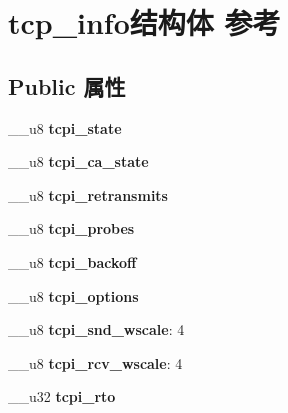 \hypertarget{structtcp__info}{}\section{tcp\+\_\+info结构体 参考}
\label{structtcp__info}
\subsection*{Public 属性}
\begin{DoxyCompactItemize}
\item 
\mbox{\label{structtcp__info_add6732e11a1cc032caf3d4774f13c38d}} 
\+\_\+\+\_\+u8 {\bfseries tcpi\+\_\+state}
\item 
\mbox{\label{structtcp__info_acb7cb67a9228b98f77091a31d52a5165}} 
\+\_\+\+\_\+u8 {\bfseries tcpi\+\_\+ca\+\_\+state}
\item 
\mbox{\label{structtcp__info_a7fa3f436ccee52262213733c53eebbf0}} 
\+\_\+\+\_\+u8 {\bfseries tcpi\+\_\+retransmits}
\item 
\mbox{\label{structtcp__info_a54d1e6bc943fa7ba8730f44478db9828}} 
\+\_\+\+\_\+u8 {\bfseries tcpi\+\_\+probes}
\item 
\mbox{\label{structtcp__info_af61eb2d7dcc0a9b80038d3afa09aee8c}} 
\+\_\+\+\_\+u8 {\bfseries tcpi\+\_\+backoff}
\item 
\mbox{\label{structtcp__info_a27b4013db297053b6e8f79cd851a582a}} 
\+\_\+\+\_\+u8 {\bfseries tcpi\+\_\+options}
\item 
\mbox{\label{structtcp__info_aea7c4bc9649303c541f1223e7b6fab3e}} 
\+\_\+\+\_\+u8 {\bfseries tcpi\+\_\+snd\+\_\+wscale}\+: 4
\item 
\mbox{\label{structtcp__info_a0f9246433f76cdb349c159fd5c2c7e34}} 
\+\_\+\+\_\+u8 {\bfseries tcpi\+\_\+rcv\+\_\+wscale}\+: 4
\item 
\mbox{\label{structtcp__info_ab5c7f5a79eac8d2f3f09c780ddab859d}} 
\+\_\+\+\_\+u32 {\bfseries tcpi\+\_\+rto}
\item 

\end{DoxyCompactItemize}
